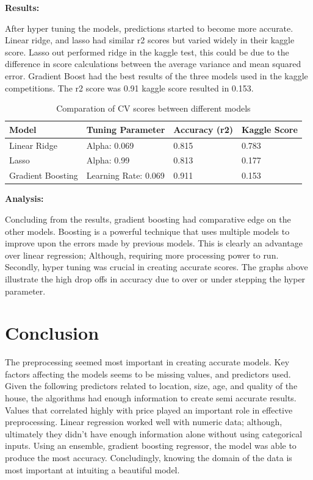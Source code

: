 \documentclass[letterpaper,10pt]{article}
\begin{document}
    \textbf{Results:} \par
After hyper tuning the models, predictions started to become more accurate.  Linear ridge, and lasso had similar r2 scores but varied widely in their kaggle score. Lasso out performed ridge in the kaggle test, this could be due to the difference in score calculations between the average variance and mean squared error.  Gradient Boost had the best results of the three models used in the kaggle competitions. The  r2 score was 0.91 kaggle score resulted in 0.153. 

\begin{table}[H]
\centering
\begin{tabular}{ |p{3cm}|p{3cm}|p{2cm}|p{2cm}| } 
 \hline
  Model & Tuning Parameter & Accuracy (r2) & Kaggle Score \\ 
 \hline
 Linear Ridge & Alpha: 0.069 & 0.815 & 0.783 \\ 
 \hline
 Lasso & Alpha: 0.99 & 0.813 & 0.177 \\ 
 \hline
 Gradient Boosting & Learning Rate: 0.069 & 0.911 & 0.153 \\ 
 \hline
\end{tabular}
\caption{Comparation of CV scores between different models}
\end{table}

     \textbf{Analysis:} \par
Concluding from the results, gradient boosting had comparative edge on the other models. Boosting is a powerful technique that uses multiple models to improve upon the errors made by previous models. This is clearly an advantage over linear regression; Although, requiring more processing power to run. Secondly, hyper tuning was crucial in creating accurate scores. The graphs above illustrate the high drop offs in accuracy due to over or under stepping the hyper parameter. 

\section{Conclusion}
The preprocessing seemed most important in creating accurate models. Key factors affecting the models seems to be missing values, and predictors used. Given the following predictors related to location, size, age, and quality of the house, the algorithms had enough information to create semi accurate results. Values that correlated highly with price played an important role in effective preprocessing. Linear regression worked well with numeric data; although, ultimately they didn't have enough information alone without using categorical inputs. Using an ensemble, gradient boosting regressor, the model was able to produce the most accuracy. Concludingly, knowing the domain of the data is most important at intuiting a beautiful model. 
\end{document}
